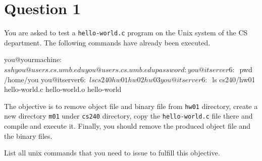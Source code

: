 
\section*{Question 1}

You are asked to test a \texttt{hello-world.c} program on the Unix system of the CS department.
The following commands have already been executed.

\begin{terminal}
you@yourmachine:~$ ssh you@users.cs.umb.edu
you@users.cs.umb.edu password:
you@itserver6:~$ pwd
/home/you
you@itserver6:~$ ls cs240
hw01 hw02 hw03
you@itserver6:~$ ls cs240/hw01
hello-world.c hello-world.o hello-world
\end{terminal}

The objective is to remove object file and binary file from \texttt{hw01} directory, create a new directory \texttt{m01} under \texttt{cs240} directory, copy the \texttt{hello-world.c} file there and compile and execute it.
Finally, you should remove the produced object file and the binary files.

List all unix commands that you need to issue to fulfill this objective.
